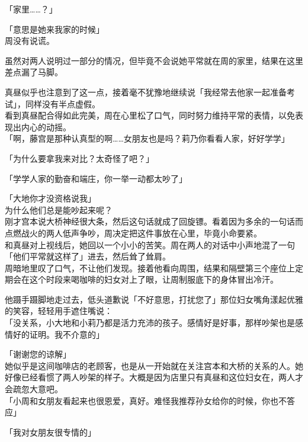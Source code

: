 「家里……？」

「意思是她来我家的时候」\\

周没有说谎。

虽然对两人说明过一部分的情况，但毕竟不会说她平常就在周的家里，结果在这里差点漏了马脚。

真昼似乎也注意到了这一点，接着毫不犹豫地继续说「我经常去他家一起准备考试」，同样没有半点虚假。\\

看到真昼配合得如此完美，周在心里松了口气，同时努力维持平常的表情，以免表现出内心的动摇。\\

「啊，藤宫是那种认真型的啊……女朋友也是吗？莉乃你看看人家，好好学学」

「为什么要拿我来对比？太奇怪了吧？」

「学学人家的勤奋和端庄，你一举一动都太吵了」

「大地你才没资格说我」\\

为什么他们总是能吵起来呢？\\

刚才宫本说大桥神经很大条，然后这句话就成了回旋镖。看着因为多余的一句话而点燃战火的两人低声争吵，周决定把这件事放在心里，毕竟小命要紧。\\

和真昼对上视线后，她回以一个小小的苦笑。周在两人的对话中小声地混了一句「他们平常就这样了」进去，然后耸了耸肩。\\

周暗地里叹了口气，不让他们发现。接着他看向周围，结果和隔壁第三个座位上定期会在这个时段来喝咖啡的妇女对上了眼，让周制服底下的身体冒出冷汗。

他蹑手蹑脚地走过去，低头道歉说「不好意思，打扰您了」那位妇女嘴角漾起优雅的笑容，轻轻用手遮住嘴说：\\

「没关系，小大地和小莉乃都是活力充沛的孩子。感情好是好事，那样吵架也是感情好的证明。我不介意的」

「谢谢您的谅解」\\

她似乎是这间咖啡店的老顾客，也是从一开始就在关注宫本和大桥的关系的人。她好像已经看惯了两人吵架的样子。大概是因为店里只有真昼和这位妇女在，两人才会疏忽大意吧。\\

「小周和女朋友看起来也很恩爱，真好。难怪我推荐孙女给你的时候，你也不答应」

「我对女朋友很专情的」\\

